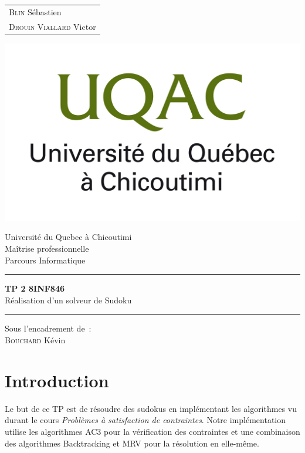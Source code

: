 \documentclass{article}
\begin{document}
\begin{titlepage}
	\vspace{-20px}
	\begin{tabular}{l}
		\textsc{Blin} Sébastien\\
		\textsc{Drouin Viallard} Victor
	\end{tabular}
	\hfill \vspace{10px}\includegraphics[scale=0.1]{uqac}\\
	\vfill
	\begin{center}
		\Huge{Université du Quebec à Chicoutimi}\\
		\vspace{1cm}
		\LARGE{Maîtrise professionnelle}\\
		\large{Parcours Informatique}\\
		\vspace{0.5cm}\hrule\vspace{0.5cm}
		\LARGE{\textbf{TP 2 8INF846}}\\
		\Large{Réalisation d'un solveur de Sudoku}
		\vspace{0.5cm}\hrule
		\vfill
		\vfill
	\end{center}
	\begin{flushleft}
		\Large{Sous l'encadrement de~:}\\
		\vspace{0.2cm}
		\large{\textsc{Bouchard} Kévin}
	\end{flushleft}
	\vfill
\end{titlepage}

\section{Introduction}
Le but de ce TP est de résoudre des sudokus en implémentant les algorithmes vu durant le cours \emph{Problèmes à satisfaction de contraintes}. Notre implémentation utilise les algorithmes AC3 pour la vérification des contraintes et une combinaison des algorithmes Backtracking et MRV pour la résolution en elle-même.
\end{document}
